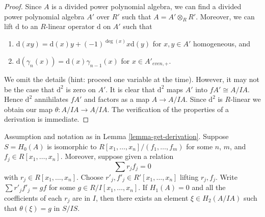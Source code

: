 \begin{proof}
Since $A$ is a divided power polynomial algebra, we can find a divided
power polynomial algebra $A'$ over $R'$ such that $A = A' \otimes_R R'$.
Moreover, we can lift $\text{d}$ to an $R$-linear
operator $\text{d}$ on $A'$ such that
\begin{enumerate}
\item  $\text{d}(xy) = \text{d}(x)y + (-1)^{\deg(x)}x \text{d}(y)$
for $x, y \in A'$ homogeneous, and
\item  $\text{d}(\gamma_n(x)) = \text{d}(x) \gamma_{n - 1}(x)$ for
$x \in A'_{even, +}$.
\end{enumerate}
We omit the details (hint: proceed one variable at the time).
However, it may not be the case that $\text{d}^2$
is zero on $A'$. It is clear that $\text{d}^2$ maps $A'$ into
$fA' \cong A/IA$. Hence $\text{d}^2$ annihilates $fA'$ and factors
as a map $A \to A/IA$. Since $\text{d}^2$ is $R$-linear we obtain
our map $\theta : A/IA \to A/IA$. The verification of the properties
of a derivation is immediate.
\end{proof}

\begin{lemma}
\label{lemma-compute-theta}
Assumption and notation as in Lemma \ref{lemma-get-derivation}.
Suppose $S = H_0(A)$ is isomorphic to
$R[x_1, \ldots, x_n]/(f_1, \ldots, f_m)$
for some $n$, $m$, and $f_j \in R[x_1, \ldots, x_n]$.
Moreover, suppose given a relation
$$
\sum r_j f_j = 0
$$
with $r_j \in R[x_1, \ldots, x_n]$.
Choose $r'_j, f'_j \in R'[x_1, \ldots, x_n]$ lifting $r_j, f_j$.
Write $\sum r'_j f'_j = gf$ for some $g \in R/I[x_1, \ldots, x_n]$.
If $H_1(A) = 0$ and all the coefficients of each $r_j$ are in $I$, then
there exists an element $\xi \in H_2(A/IA)$ such that
$\theta(\xi) = g$ in $S/IS$.
\end{lemma}

